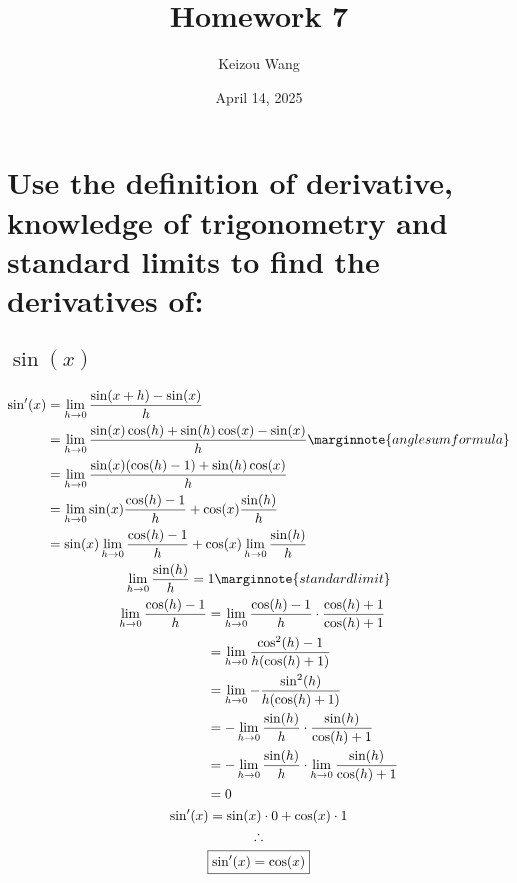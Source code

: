 \documentclass[letterpaper]{article}
\title{Homework 7}
\author{Keizou Wang}
\date{April 14, 2025}
\begin{document}
\maketitle

\section{Use the definition of derivative, knowledge of trigonometry and standard limits to find the derivatives of:}
\subsection{$\sin(x)$}
\begin{gather*}
	\begin{aligned}
		\sin'(x)&=\lim_{h\rightarrow 0}\frac{\sin(x+h)-\sin(x)}{h} \\
		&=\lim_{h\rightarrow 0}\frac{\sin(x)\cos(h)+\sin(h)\cos(x)-\sin(x)}{h} \marginnote{angle sum formula} \\
		&=\lim_{h\rightarrow 0}\frac{\sin(x)(\cos(h)-1)+\sin(h)\cos(x)}{h} \\
		&=\lim_{h\rightarrow 0}\sin(x)\frac{\cos(h)-1}{h}+\cos(x)\frac{\sin(h)}{h} \\
		&=\sin(x)\lim_{h\rightarrow 0}\frac{\cos(h)-1}{h}+\cos(x)\lim_{h\rightarrow 0}\frac{\sin(h)}{h} \\
	\end{aligned} \\
	\lim_{h\rightarrow 0}\frac{\sin(h)}{h}=1 \marginnote{standard limit} \\
	\begin{aligned}
		\lim_{h\rightarrow 0}\frac{\cos(h)-1}{h}&=\lim_{h\rightarrow 0}\frac{\cos(h)-1}{h}\cdot\frac{\cos(h)+1}{\cos(h)+1} \\
		&=\lim_{h\rightarrow 0}\frac{\cos^2(h)-1}{h(\cos(h)+1)} \\
		&=\lim_{h\rightarrow 0}-\frac{\sin^2(h)}{h(\cos(h)+1)} \\
		&=-\lim_{h\rightarrow 0}\frac{\sin(h)}{h}\cdot\frac{\sin(h)}{\cos(h)+1} \\
		&=-\lim_{h\rightarrow 0}\frac{\sin(h)}{h}\cdot\lim_{h\rightarrow 0}\frac{\sin(h)}{\cos(h)+1} \\
		&=0
	\end{aligned} \\
	\sin'(x)=\sin(x)\cdot0+\cos(x)\cdot1 \\
	\therefore \\
	\boxed{\sin'(x)=\cos(x)}
\end{gather*}
\end{document}
